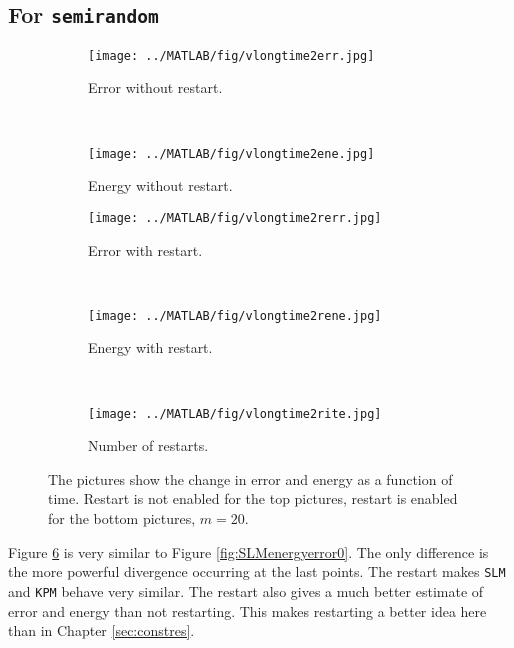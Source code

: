 \subsection{For \texttt{semirandom}} %
\begin{figure}[H]
        \centering
        \begin{subfigure}[b]{0.3\textwidth}
                \texttt{[image: ../MATLAB/fig/vlongtime2err.jpg]}
                \caption{ Error without restart. }
                \label{fig:vlongtime2err}
        \end{subfigure}
        ~
        \begin{subfigure}[b]{0.3\textwidth}
                \texttt{[image: ../MATLAB/fig/vlongtime2ene.jpg]}
                \caption{ Energy without restart. }
                \label{fig:vlongtime8err}
        \end{subfigure}

        \begin{subfigure}[b]{0.3\textwidth}
                \texttt{[image: ../MATLAB/fig/vlongtime2rerr.jpg]}
                \caption{ Error with restart. }
                \label{fig:vlongtime2rerr}
        \end{subfigure}
        ~
        \begin{subfigure}[b]{0.3\textwidth}
                \texttt{[image: ../MATLAB/fig/vlongtime2rene.jpg]}
                \caption{ Energy with restart. }
                \label{fig:vlongtime8rerr}
        \end{subfigure}
     	~
        \begin{subfigure}[b]{0.3\textwidth}
                \texttt{[image: ../MATLAB/fig/vlongtime2rite.jpg]}
                \caption{ Number of restarts. }
                \label{fig:vlongtime2rene}
        \end{subfigure}        
        
        \caption{ The pictures show the change in error and energy as a function of time.  Restart is not enabled for the top pictures, restart is enabled for the bottom pictures, $m = 20$. }
        \label{fig:vSLMenergyerror1}
\end{figure}
\noindent Figure \ref{fig:vSLMenergyerror1} is very similar to Figure \ref{fig:SLMenergyerror0}. The only difference is the more powerful divergence occurring at the last points. 
The restart makes \texttt{SLM} and \texttt{KPM} behave very similar. The restart also gives a much better estimate of error and energy than not restarting. This makes restarting a better idea here than in Chapter \ref{sec:constres}. \\

